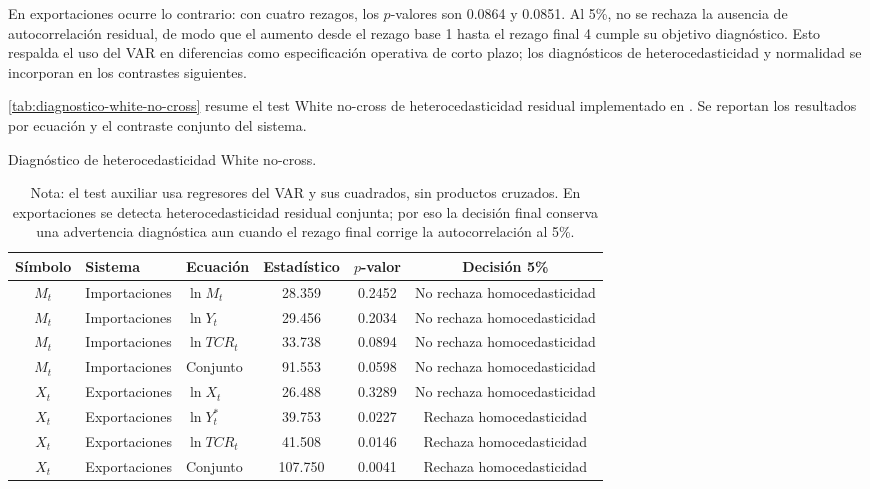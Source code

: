 \documentclass[11pt,a4paper]{article}
\begin{document}
	En exportaciones ocurre lo contrario: con cuatro rezagos, los \(p\)-valores
	son 0.0864 y 0.0851. Al 5\%, no se rechaza la ausencia de autocorrelación
	residual, de modo que el aumento desde el rezago base 1 hasta el rezago final 4
	cumple su objetivo diagnóstico. Esto respalda el uso del VAR en diferencias
	como especificación operativa de corto plazo; los diagnósticos de
	heterocedasticidad y normalidad se incorporan en los contrastes siguientes.
	
	\autoref{tab:diagnostico-white-no-cross} resume el test White no-cross de
	heterocedasticidad residual implementado en .
	Se reportan los resultados por ecuación y el contraste conjunto del sistema.
	
	\begin{table}[H]
		\centering
		\caption{Diagnóstico de heterocedasticidad White no-cross.}
		\label{tab:diagnostico-white-no-cross}
		\scriptsize
		\begin{tabular}{cllccc}
			\toprule
			Símbolo & Sistema & Ecuación & Estadístico & \(p\)-valor & Decisión 5\% \\
			\midrule
			\(M_t\) & Importaciones & \(\ln M_t\) & 28.359 & 0.2452 & No rechaza homocedasticidad \\
			\(M_t\) & Importaciones & \(\ln Y_t\) & 29.456 & 0.2034 & No rechaza homocedasticidad \\
			\(M_t\) & Importaciones & \(\ln TCR_t\) & 33.738 & 0.0894 & No rechaza homocedasticidad \\
			\(M_t\) & Importaciones & Conjunto & 91.553 & 0.0598 & No rechaza homocedasticidad \\
			\(X_t\) & Exportaciones & \(\ln X_t\) & 26.488 & 0.3289 & No rechaza homocedasticidad \\
			\(X_t\) & Exportaciones & \(\ln Y_t^*\) & 39.753 & 0.0227 & Rechaza homocedasticidad \\
			\(X_t\) & Exportaciones & \(\ln TCR_t\) & 41.508 & 0.0146 & Rechaza homocedasticidad \\
			\(X_t\) & Exportaciones & Conjunto & 107.750 & 0.0041 & Rechaza homocedasticidad \\
			\bottomrule
		\end{tabular}
		\caption*{\footnotesize Nota: el test auxiliar usa regresores del VAR y sus
			cuadrados, sin productos cruzados. En exportaciones se detecta
			heterocedasticidad residual conjunta; por eso la decisión final conserva una
			advertencia diagnóstica aun cuando el rezago final corrige la autocorrelación al
			5\%.}
	\end{table}
	
\end{document}
